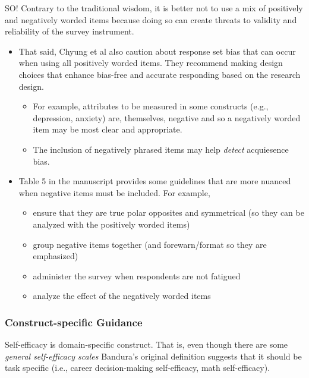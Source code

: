 \documentclass[
  english,
]{book}
\providecommand{\tightlist}{%
  \setlength{\itemsep}{0pt}\setlength{\parskip}{0pt}}
\begin{document}
SO! Contrary to the traditional wisdom, it is better not to use a mix of positively and negatively worded items because doing so can create threats to validity and reliability of the survey instrument.

\begin{itemize}
\tightlist
\item
  That said, Chyung et al \citeyearpar{chyung_evidencebased_2018} also caution about response set bias that can occur when using all positively worded items. They recommend making design choices that enhance bias-free and accurate responding based on the research design.

  \begin{itemize}
  \tightlist
  \item
    For example, attributes to be measured in some constructs (e.g., depression, anxiety) are, themselves, negative and so a negatively worded item may be most clear and appropriate.
  \item
    The inclusion of negatively phrased items may help \emph{detect} acquiesence bias.
  \end{itemize}
\item
  Table 5 in the manuscript provides some guidelines that are more nuanced when negative items must be included. For example,

  \begin{itemize}
  \tightlist
  \item
    ensure that they are true polar opposites and symmetrical (so they can be analyzed with the positively worded items)
  \item
    group negative items together (and forewarn/format so they are emphasized)
  \item
    administer the survey when respondents are not fatigued
  \item
    analyze the effect of the negatively worded items
  \end{itemize}
\end{itemize}

\hypertarget{construct-specific-guidance}{%
\subsubsection{Construct-specific Guidance}\label{construct-specific-guidance}}

Self-efficacy is domain-specific construct. That is, even though there are some \emph{general self-efficacy scales} Bandura's original definition suggests that it should be task specific (i.e., career decision-making self-efficacy, math self-efficacy).
\end{document}

